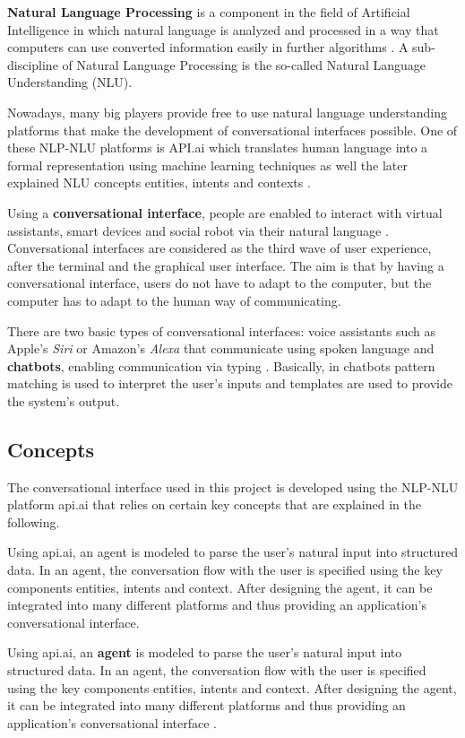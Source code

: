 \textbf{Natural Language Processing} is a component in the field of Artificial Intelligence in which natural language is analyzed and processed in a way that computers can use converted information easily in further algorithms \cite{collobert08}. A sub-discipline of Natural Language Processing is the so-called Natural Language Understanding (NLU).

Nowadays, many big players provide free to use natural language understanding platforms that make the development of conversational interfaces possible. One of these NLP-NLU platforms is API.ai which translates human language into a formal representation using machine learning techniques as well the later explained NLU concepts entities, intents and contexts \cite{apiai:concepts}.

Using a \textbf{conversational interface}, people are enabled to interact with virtual assistants, smart devices and social robot via their natural language \cite{mctear16}. Conversational interfaces are considered as the third wave of user experience, after the terminal and the graphical user interface. The aim is that by having a conversational interface, users do not have to adapt to the computer, but the computer has to adapt to the human way of communicating.

There are two basic types of conversational interfaces: voice assistants such as Apple's \textit{Siri} or Amazon's \textit{Alexa} that communicate using spoken language and \textbf{chatbots}, enabling communication via typing \cite{fastcodedesign:conversationalinterface}. Basically, in chatbots pattern matching is used to interpret the user's inputs and templates are used to provide the system's output.
 

\subsection{Concepts}

The conversational interface used in this project is developed using the NLP-NLU platform api.ai that relies on certain key concepts that are explained in the following.

Using api.ai, an agent is modeled to parse the user’s natural input into structured data. In an agent, the conversation flow with the user is specified using the key components entities, intents and context. After designing the agent, it can be integrated into many different platforms and thus providing an application’s conversational interface.

Using api.ai, an \textbf{agent} is modeled to parse the user’s natural input into structured data. In an agent, the conversation flow with the user is specified using the key components entities, intents and context. After designing the agent, it can be integrated into many different platforms and thus providing an application’s conversational interface \cite{apiai:agents}.


